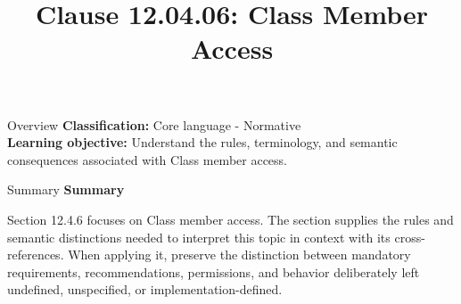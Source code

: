 \documentclass[10pt,letterpaper]{article}
\title{Clause 12.04.06: Class Member Access}
\author{}
\date{}
\begin{document}
\maketitle
\begin{CornellOverviewBox}{Overview}
\textbf{Classification:} Core language - Normative\\[2pt]
\textbf{Learning objective:} Understand the rules, terminology, and semantic consequences associated with Class member access.
\end{CornellOverviewBox}\begin{CornellSummaryBox}{Summary}
{\sffamily\bfseries\color{Accent} Summary}\par\vspace{3pt}Section 12.4.6 focuses on Class member access. The section supplies the rules and semantic distinctions needed to interpret this topic in context with its cross-references. When applying it, preserve the distinction between mandatory requirements, recommendations, permissions, and behavior deliberately left undefined, unspecified, or implementation-defined.
\end{CornellSummaryBox}
\end{document}

